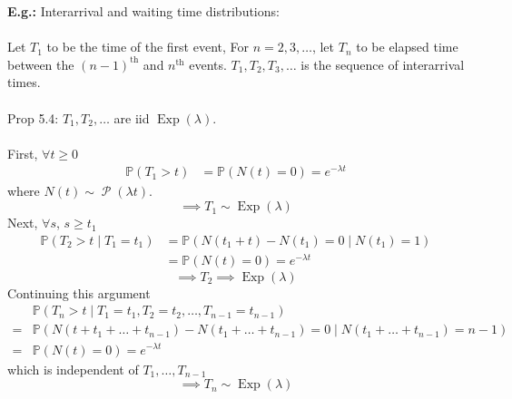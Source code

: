 \documentclass[a4paper]{article}
\newcommand{\n}{\hfill\break}
\newcommand{\eg}[1]{\par\noindent\settowidth{\hangindent}{\textbf{E.g.: }}\textbf{E.g.: }#1\n}
\newcommand{\Prob}{\mathbb{P}}
\renewcommand{\P}{\Prob}
\DeclareMathOperator{\Poiss}{\mathcal{P}}
\DeclareMathOperator{\Exp}{\text{Exp}}
\begin{document}
\eg{
Interarrival and waiting time distributions:
\\\\
Let $T_1$ to be the time of the first event, For $n=2,3,\dots$, let $T_n$ to be elapsed time between the $(n-1)^\text{th}$ and $n^\text{th}$ events. $T_1, T_2, T_3,\dots$ is the sequence of interarrival times.
\\\\
Prop 5.4: $T_1, T_2,\dots$ are iid $\Exp(\lambda)$.
\\\\
First, $\forall t\geq 0$
\begin{align*}
    \P(T_1>t)&=\P(N(t)=0)=e^{-\lambda t}
\end{align*}
where $N(t)\sim\Poiss(\lambda t)$.
\[\implies T_1\sim\Exp(\lambda)\]
Next, $\forall s$, $s\geq t_1$
\begin{align*}
    \P(T_2>t\mid T_1=t_1)&=\P(N(t_1+t)-N(t_1)=0\mid N(t_1)=1) \\
    &=\P(N(t)=0)=e^{-\lambda t}
\end{align*}
\[\implies T_2\implies\Exp(\lambda)\]
Continuing this argument
\begin{align*}
    &\P(T_n>t\mid T_1=t_1, T_2=t_2, \dots, T_{n-1}=t_{n-1}) \\
    =&\P(N(t+t_1+\dots+t_{n-1})-N(t_1+\dots+t_{n-1})=0\mid N(t_1+\dots+t_{n-1})=n-1) \\
    =&\P(N(t)=0)=e^{-\lambda t}
\end{align*}
which is independent of $T_1, \dots, T_{n-1}$
\[\implies T_n\sim\Exp(\lambda)\]
}
\end{document}
